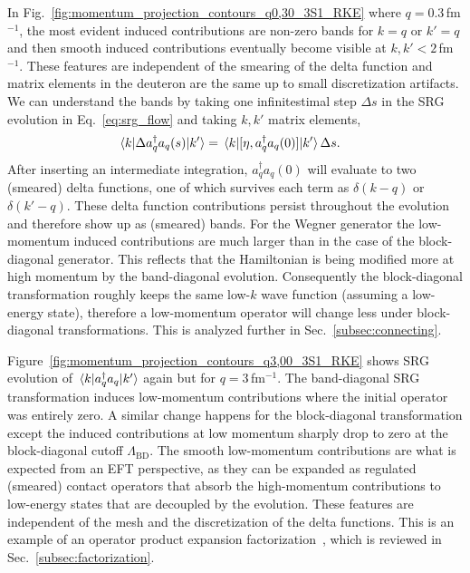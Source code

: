 \documentclass[10pt,aps,prc,floatfix,twocolumn,nofootinbib]{revtex4-1}
\newcommand{\LambdaBD}{{\Lambda_{\text{BD}}}}
\newcommand{\ataq}{a^{\dagger}_q a_q}
\begin{document}
In Fig.~\ref{fig:momentum_projection_contours_q0,30_3S1_RKE} where $q=0.3$\,fm$^{-1}$, the most evident induced contributions are non-zero bands for $k=q$ or $k'=q$ and then smooth induced contributions eventually become visible at $k,k'<2$\,fm$^{-1}$.
These features are independent of the smearing of the delta function and matrix elements in the deuteron are the same up to small discretization artifacts.
We can understand the bands by taking one infinitestimal step $\Delta s$ in the SRG evolution in Eq.~\eqref{eq:srg_flow} and taking $k,k'$ matrix elements,
%
\begin{align}
    \mel{k}{\Delta \ataq(s)}{k'} &= \mel{k}{[\eta, \ataq(0)]}{k'} \Delta s.
\end{align}
%
After inserting an intermediate integration, $\ataq(0)$ will evaluate to two (smeared) delta functions, one of which survives each term as $\delta(k-q)$ or $\delta(k'-q)$.
These delta function contributions persist throughout the evolution and therefore show up as (smeared) bands.
For the Wegner generator the low-momentum induced contributions are much larger than in the case of the block-diagonal generator. 
This reflects that the Hamiltonian is being modified more at high momentum by the band-diagonal evolution.
Consequently the block-diagonal transformation roughly keeps the same low-$k$ wave function (assuming a low-energy state), therefore a low-momentum operator will change less under block-diagonal transformations.
This is analyzed further in Sec.~\ref{subsec:connecting}.


Figure~\ref{fig:momentum_projection_contours_q3,00_3S1_RKE} shows SRG evolution of $\mel{k}{\ataq}{k'}$ again but for $q=3$\,fm$^{-1}$.
The band-diagonal SRG transformation induces low-momentum contributions where the initial operator was entirely zero.
A similar change happens for the block-diagonal transformation except the induced contributions at low momentum sharply drop to zero at the block-diagonal cutoff $\LambdaBD$.
The smooth low-momentum contributions are what is expected from an EFT perspective, as they can be expanded as regulated (smeared) contact operators that absorb the high-momentum contributions to low-energy states that are decoupled by the evolution.
These features are independent of the mesh and the discretization of the delta functions.
This is an example of an operator product expansion factorization~\cite{Anderson:2010aq,Bogner:2012zm}, which is reviewed in Sec.~\ref{subsec:factorization}.
\end{document}
